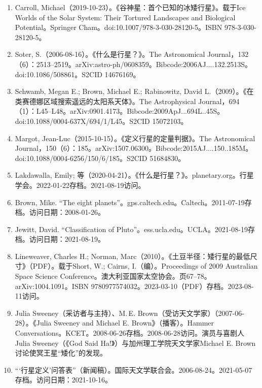 \begin{enumerate}
\item Carroll, Michael（2019-10-23）。《谷神星：首个已知的冰矮行星》。载于Ice Worlds of the Solar System: Their Tortured Landscapes and Biological Potential。Springer Cham。doi:10.1007/978-3-030-28120-5。ISBN 978-3-030-28120-5。
\item Soter, S.（2006-08-16）。《什么是行星？》。The Astronomical Journal，132（6）：2513–2519。arXiv:astro-ph/0608359。Bibcode:2006AJ....132.2513S。doi:10.1086/508861。S2CID 14676169。
\item Schwamb, Megan E.; Brown, Michael E.; Rabinowitz, David L.（2009）。《在类赛德娜区域搜索遥远的太阳系天体》。The Astrophysical Journal，694（1）：L45–L48。arXiv:0901.4173。Bibcode:2009ApJ...694L..45S。doi:10.1088/0004-637X/694/1/L45。S2CID 15072103。
\item Margot, Jean-Luc（2015-10-15）。《定义行星的定量判据》。The Astronomical Journal，150（6）：185。arXiv:1507.06300。Bibcode:2015AJ....150..185M。doi:10.1088/0004-6256/150/6/185。S2CID 51684830。
\item Lakdawalla, Emily; 等（2020-04-21）。《什么是行星？》。planetary.org。行星学会。2022-01-22存档。2021-08-19访问。
\item Brown, Mike. “The eight planets”。gps.caltech.edu。Caltech。2011-07-19存档。访问日期：2008-01-26。
\item Jewitt, David. “Classification of Pluto”。ess.ucla.edu。UCLA。2021-08-19存档。访问日期：2021-08-19。
\item Lineweaver, Charles H.; Norman, Marc（2010）。《土豆半径：矮行星的最低尺寸》（PDF）。载于Short, W.; Cairns, I.（编）。Proceedings of 2009 Australian Space Science Conference。澳大利亚国家太空协会。页67–78。arXiv:1004.1091。ISBN 9780977574032。2023-03-10（PDF）存档。2023-08-11访问。
\item Julia Sweeney（采访者与主持）、M.\,E. Brown（受访天文学家）（2007-06-28）。《Julia Sweeney and Michael E. Brown》（播客）。Hammer Conversations。KCET。2008-06-26存档。2008-06-28访问。演员与喜剧人Julia Sweeney（《God Said Ha!》）与加州理工学院天文学家Michael E. Brown讨论使冥王星“矮化”的发现。
\item “‘行星定义’问答表”（新闻稿）。国际天文学联合会。2006-08-24。2021-05-07存档。访问日期：2021-10-16。

\end{enumerate}


